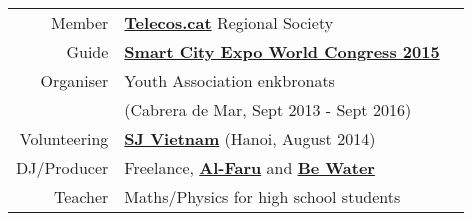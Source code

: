 \documentclass[]{deedy-resume}
\begin{document}
\begin{minipage}[t]{0.43\textwidth}
\begin{tabular}{rll}
Member & \textbf{\href{www.telecos.cat}{Telecos.cat}} Regional Society\\
Guide & \textbf{\href{http://www.smartcityexpo.com/en/}{Smart City Expo World Congress 2015}}\\
Organiser & Youth Association enkbronats \\
& (Cabrera de Mar, Sept 2013 - Sept 2016) \\
Volunteering &  \textbf{\href{http://www.sjvietnam.org/}{SJ Vietnam}} (Hanoi, August 2014)\\
DJ/Producer & Freelance, \textbf{\href{http://www.alfaru.es/}{Al-Faru}} and \textbf{\href{http://www.bewater.cat/}{Be Water}}\\
Teacher & Maths/Physics for high school students
\end{tabular}\\

\sectionsep


\end{minipage}
\end{document}
